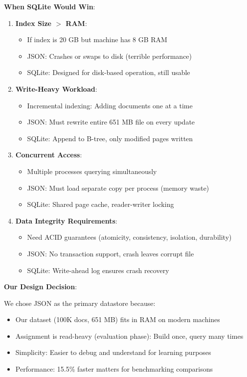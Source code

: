 \documentclass[12pt,a4paper]{article}
\begin{document}
\textbf{When SQLite Would Win}:

\begin{enumerate}
    \item \textbf{Index Size $>$ RAM}:
    \begin{itemize}
        \item If index is 20 GB but machine has 8 GB RAM
        \item JSON: Crashes or swaps to disk (terrible performance)
        \item SQLite: Designed for disk-based operation, still usable
    \end{itemize}
    
    \item \textbf{Write-Heavy Workload}:
    \begin{itemize}
        \item Incremental indexing: Adding documents one at a time
        \item JSON: Must rewrite entire 651 MB file on every update
        \item SQLite: Append to B-tree, only modified pages written
    \end{itemize}
    
    \item \textbf{Concurrent Access}:
    \begin{itemize}
        \item Multiple processes querying simultaneously
        \item JSON: Must load separate copy per process (memory waste)
        \item SQLite: Shared page cache, reader-writer locking
    \end{itemize}
    
    \item \textbf{Data Integrity Requirements}:
    \begin{itemize}
        \item Need ACID guarantees (atomicity, consistency, isolation, durability)
        \item JSON: No transaction support, crash leaves corrupt file
        \item SQLite: Write-ahead log ensures crash recovery
    \end{itemize}
\end{enumerate}

\textbf{Our Design Decision}:

We chose JSON as the primary datastore because:
\begin{itemize}
    \item Our dataset (100K docs, 651 MB) fits in RAM on modern machines
    \item Assignment is read-heavy (evaluation phase): Build once, query many times
    \item Simplicity: Easier to debug and understand for learning purposes
    \item Performance: 15.5\% faster matters for benchmarking comparisons
\end{itemize}
\end{document}
